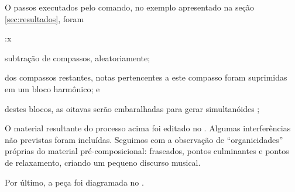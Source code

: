 O passos executados pelo comando, no exemplo apresentado na seção \ref{sec:resultados}, foram \begin{inparaenum}:x
\item subtração de compassos, aleatoriamente;
\item dos compassos restantes, notas pertencentes a este compasso foram suprimidas em um bloco harmônico; e
\item destes blocos, as oitavas serão embaralhadas para gerar simultanóides \cite{koellreutter_introducao_1987};
\end{inparaenum}

O material resultante do processo acima foi editado no \cite{musescore_2015}. Algumas interferências não previstas foram incluídas. Seguimos com a observação de ``organicidades'' próprias do material pré-composicional: fraseados, pontos culminantes e pontos de relaxamento, criando um pequeno discurso musical.

Por último, a peça foi diagramada no \cite{lilypond_2015}.